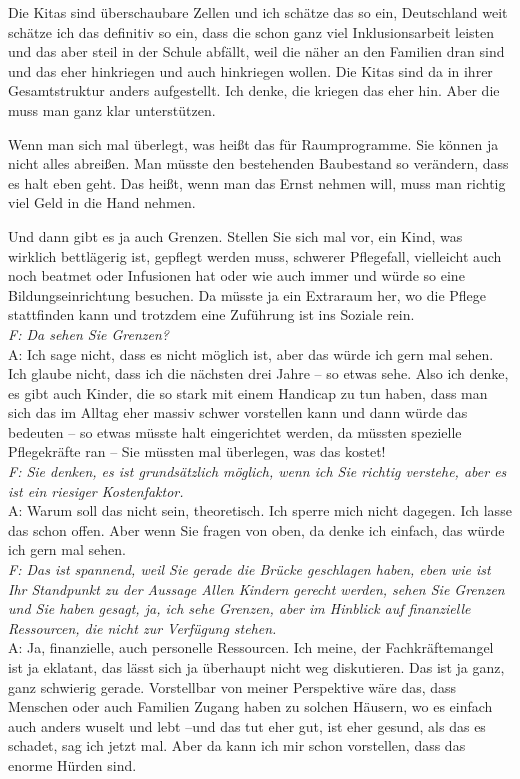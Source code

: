 \begin{linenumbers*}
Die Kitas sind überschaubare Zellen und ich schätze das so ein, Deutschland weit schätze ich das definitiv so ein, dass die schon ganz viel Inklusionsarbeit leisten und das aber steil in der Schule abfällt, weil die näher an den Familien dran sind und das eher hinkriegen und auch hinkriegen wollen. Die Kitas sind da in ihrer Gesamtstruktur anders aufgestellt. Ich denke, die kriegen das eher hin. Aber die muss man ganz klar unterstützen. 

Wenn man sich mal überlegt, was heißt das für Raumprogramme. Sie können ja nicht alles abreißen. Man müsste den bestehenden Baubestand so verändern, dass es halt eben geht. Das heißt, wenn man das Ernst nehmen will, muss man richtig viel Geld in die Hand nehmen.
  
Und dann gibt es ja auch Grenzen. Stellen Sie sich mal vor, ein Kind, was wirklich bettlägerig ist, gepflegt werden muss, schwerer Pflegefall, vielleicht auch noch beatmet oder Infusionen hat oder wie auch immer und würde so eine Bildungseinrichtung besuchen. Da müsste ja ein Extraraum her, wo die Pflege stattfinden kann und trotzdem eine Zuführung ist ins Soziale rein.\\ 
\emph{F: Da sehen Sie Grenzen?}\\
A: Ich sage nicht, dass es nicht möglich ist, aber das würde ich gern mal sehen. Ich glaube nicht, dass ich die nächsten drei Jahre -- so etwas sehe. Also ich denke, es gibt auch Kinder, die so stark mit einem Handicap zu tun haben, dass man sich das im Alltag eher massiv schwer vorstellen kann und dann würde das bedeuten -- so etwas müsste halt eingerichtet werden, da müssten spezielle Pflegekräfte ran -- Sie müssten mal überlegen, was das kostet!\\ 
\emph{F: Sie denken, es ist grundsätzlich möglich, wenn ich Sie richtig verstehe, aber es ist ein riesiger Kostenfaktor.}\\
A: Warum soll das nicht sein, theoretisch. Ich sperre mich nicht dagegen. Ich lasse das schon offen. Aber wenn Sie fragen von oben, da denke ich einfach, das würde ich gern mal sehen.\\
 \emph{F: Das ist spannend, weil Sie gerade die Brücke geschlagen haben, eben wie ist Ihr Standpunkt zu der Aussage Allen Kindern gerecht werden, sehen Sie Grenzen und Sie haben gesagt, ja, ich sehe Grenzen, aber im Hinblick auf finanzielle Ressourcen, die nicht zur Verfügung stehen.}\\ 
A: Ja, finanzielle, auch personelle Ressourcen. Ich meine, der Fachkräftemangel ist ja eklatant, das lässt sich ja überhaupt nicht weg diskutieren. Das ist ja ganz, ganz schwierig gerade. Vorstellbar von meiner Perspektive wäre das, dass Menschen oder auch Familien Zugang haben zu solchen Häusern, wo es einfach auch anders wuselt und lebt  --und das tut eher gut, ist eher gesund, als das es schadet, sag ich jetzt mal. Aber da kann ich mir schon vorstellen, dass das enorme Hürden sind. 


\end{linenumbers*}
